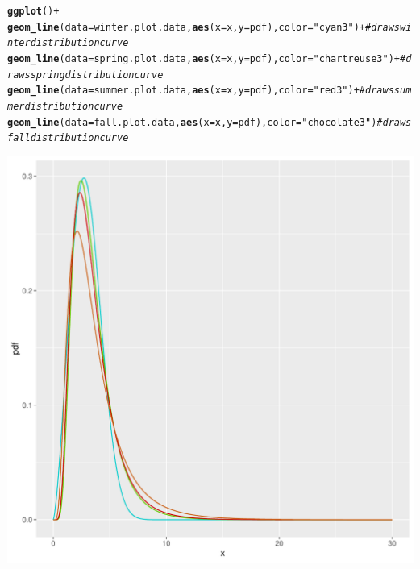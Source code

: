 \documentclass{article}\usepackage[]{graphicx}\usepackage[]{xcolor}
\makeatletter
\def\maxwidth{ %
  \ifdim\Gin@nat@width>\linewidth
    \linewidth
  \else
    \Gin@nat@width
  \fi
}
\newcommand{\hlsng}[1]{\textcolor[rgb]{0.192,0.494,0.8}{#1}}%
\newcommand{\hlcom}[1]{\textcolor[rgb]{0.678,0.584,0.686}{\textit{#1}}}%
\newcommand{\hlopt}[1]{\textcolor[rgb]{0,0,0}{#1}}%
\newcommand{\hldef}[1]{\textcolor[rgb]{0.345,0.345,0.345}{#1}}%
\newcommand{\hlkwc}[1]{\textcolor[rgb]{0.333,0.667,0.333}{#1}}%
\newcommand{\hlkwd}[1]{\textcolor[rgb]{0.737,0.353,0.396}{\textbf{#1}}}%
\newenvironment{kframe}{%
 \def\at@end@of@kframe{}%
 \ifinner\ifhmode%
  \def\at@end@of@kframe{\end{minipage}}%
  \begin{minipage}{\columnwidth}%
 \fi\fi%
 \def\FrameCommand##1{\hskip\@totalleftmargin \hskip-\fboxsep
 \colorbox{shadecolor}{##1}\hskip-\fboxsep
     \hskip-\linewidth \hskip-\@totalleftmargin \hskip\columnwidth}%
 \MakeFramed {\advance\hsize-\width
   \@totalleftmargin\z@ \linewidth\hsize
   \@setminipage}}%
 {\par\unskip\endMakeFramed%
 \at@end@of@kframe}
\newenvironment{knitrout}{}{} %
\makeatother
\begin{document}
\begin{knitrout}
\begin{kframe}
\begin{alltt}
\hlkwd{ggplot}\hldef{()} \hlopt{+}
  \hlkwd{geom_line}\hldef{(}\hlkwc{data} \hldef{= winter.plot.data,} \hlkwd{aes}\hldef{(}\hlkwc{x} \hldef{= x,} \hlkwc{y} \hldef{= pdf),} \hlkwc{color} \hldef{=} \hlsng{"cyan3"}\hldef{)} \hlopt{+} \hlcom{#draws winter distribution curve}
  \hlkwd{geom_line}\hldef{(}\hlkwc{data} \hldef{= spring.plot.data,} \hlkwd{aes}\hldef{(}\hlkwc{x} \hldef{= x,} \hlkwc{y} \hldef{= pdf),} \hlkwc{color} \hldef{=} \hlsng{"chartreuse3"}\hldef{)} \hlopt{+} \hlcom{#draws spring distribution curve}
  \hlkwd{geom_line}\hldef{(}\hlkwc{data} \hldef{= summer.plot.data,} \hlkwd{aes}\hldef{(}\hlkwc{x} \hldef{= x,} \hlkwc{y} \hldef{= pdf),} \hlkwc{color} \hldef{=} \hlsng{"red3"}\hldef{)} \hlopt{+} \hlcom{#draws summer distribution curve}
  \hlkwd{geom_line}\hldef{(}\hlkwc{data} \hldef{= fall.plot.data,} \hlkwd{aes}\hldef{(}\hlkwc{x} \hldef{= x,} \hlkwc{y} \hldef{= pdf),} \hlkwc{color} \hldef{=} \hlsng{"chocolate3"}\hldef{)} \hlcom{#draws fall distribution curve}
\end{alltt}
\end{kframe}
\includegraphics[width=\maxwidth]{figure/unnamed-chunk-3-1} 
\end{knitrout}



\end{document}
